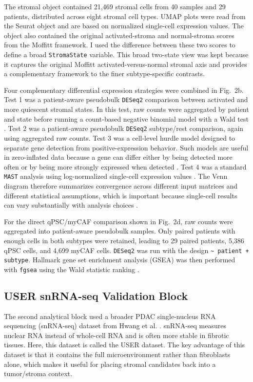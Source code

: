 \documentclass[11pt,a4paper]{article}
\begin{document}
The stromal object contained 21,469 stromal cells from 40 samples and 29 patients, distributed across eight stromal cell types. UMAP plots were read from the Seurat object and are based on normalized single-cell expression values. The object also contained the original activated-stroma and normal-stroma scores from the Moffitt framework. I used the difference between these two scores to define a broad \texttt{StromaState} variable. This broad two-state view was kept because it captures the original Moffitt activated-versus-normal stromal axis and provides a complementary framework to the finer subtype-specific contrasts.

Four complementary differential expression strategies were combined in Fig.~2b. Test 1 was a patient-aware pseudobulk \texttt{DESeq2} comparison between activated and more quiescent stromal states. In this test, raw counts were aggregated by patient and state before running a count-based negative binomial model with a Wald test \citep{love2014}. Test 2 was a patient-aware pseudobulk \texttt{DESeq2} subtype/rest comparison, again using aggregated raw counts. Test 3 was a cell-level hurdle model designed to separate gene detection from positive-expression behavior. Such models are useful in zero-inflated data because a gene can differ either by being detected more often or by being more strongly expressed when detected \citep{finak2015}. Test 4 was a standard \texttt{MAST} analysis using log-normalized single-cell expression values \citep{finak2015}. The Venn diagram therefore summarizes convergence across different input matrices and different statistical assumptions, which is important because single-cell results can vary substantially with analysis choices \citep{vieth2019}.

For the direct qPSC/myCAF comparison shown in Fig.~2d, raw counts were aggregated into patient-aware pseudobulk samples. Only paired patients with enough cells in both subtypes were retained, leading to 29 paired patients, 5,386 qPSC cells, and 4,699 myCAF cells. \texttt{DESeq2} was run with the design \texttt{\textasciitilde{} patient + subtype}. Hallmark gene set enrichment analysis (GSEA) was then performed with \texttt{fgsea} using the Wald statistic ranking \citep{subramanian2005,korotkevich2021}.

\subsection{USER snRNA-seq Validation Block}
The second analytical block used a broader PDAC single-nucleus RNA sequencing (snRNA-seq) dataset from Hwang et al. \citep{peng2020}. snRNA-seq measures nuclear RNA instead of whole-cell RNA and is often more stable in fibrotic tissues. Here, this dataset is called the USER dataset. The key advantage of this dataset is that it contains the full microenvironment rather than fibroblasts alone, which makes it useful for placing stromal candidates back into a tumor/stroma context.
\end{document}
